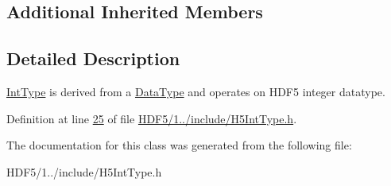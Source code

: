 \subsection*{Additional Inherited Members}


\subsection{Detailed Description}
\hyperlink{class_h5_1_1_int_type}{Int\+Type} is derived from a \hyperlink{class_h5_1_1_data_type}{Data\+Type} and operates on H\+D\+F5 integer datatype. 

Definition at line \hyperlink{_h_d_f5_21_810_81_2include_2_h5_int_type_8h_source_l00025}{25} of file \hyperlink{_h_d_f5_21_810_81_2include_2_h5_int_type_8h_source}{H\+D\+F5/1../include/\+H5\+Int\+Type.\+h}.



The documentation for this class was generated from the following file\+:\begin{DoxyCompactItemize}
\item 
H\+D\+F5/1../include/\+H5\+Int\+Type.\+h\end{DoxyCompactItemize}
